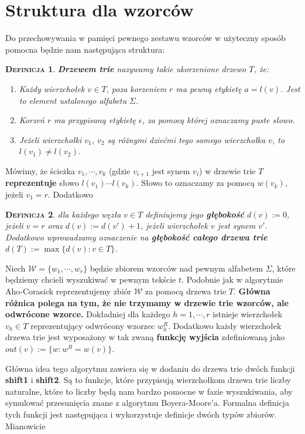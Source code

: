 \documentclass[a4paper,11pt]{article}
\newtheorem{DEF}{\textsc{Definicja}}[section]
\begin{document}
\section{Struktura dla wzorców}
Do przechowywania w pamięci pewnego zestawu wzorców w użyteczny sposób pomocna będzie nam następująca struktura:

\begin{DEF}
\textbf{Drzewem trie} nazywamy takie ukorzenione drzewo $T$, że:
\begin{enumerate}
    \item Każdy wierzchołek $v \in T$, poza korzeniem $r$ ma pewną etykietę $a = l(v)$. Jest to element ustalonego alfabetu $\Sigma$.
    \item Korzeń $r$ ma przypisaną etykietę $\epsilon$, za pomocą której oznaczamy puste słowo.
    \item Jeżeli wierzchołki $v_1$, $v_2$ są różnymi dziećmi tego samego wierzchołka $v$, to $l(v_1) \neq l(v_2)$.
\end{enumerate}
\end{DEF}

\noindent Mówimy, że ścieżka $v_1, \cdots, v_k$ (gdzie $v_{i+1}$ jest synem $v_i$) w drzewie trie $T$ \textbf{reprezentuje} słowo $l(v_1)\cdots l(v_k)$. Słowo to oznaczamy za pomocą $w(v_k)$, jeżeli $v_1 = r$. Dodatkowo 

\begin{DEF}
dla każdego węzła $v\in T$ definiujemy jego \textbf{głębokość} $d(v) := 0$, jeżeli $v=r$ oraz $d(v) := d(v') + 1$, jeżeli wierzchołek $v$ jest synem $v'$.
Dodatkowo wprowadzamy oznaczenie na \textbf{głębokość całego drzewa trie} $d(T) := \max \{ d(v) : v \in T\}$.
\end{DEF}

Niech $\mathcal{W} = \{ w_1, \cdots, w_r\}$ będzie zbiorem wzorców nad pewnym alfabetem $\Sigma$, które będziemy chcieli wyszukiwać w pewnym tekście $t$. Podobnie jak w algorytmie Aho-Corasick reprezentujemy zbiór $\mathcal{W}$ za pomocą drzewa trie $T$. \textbf{Główna różnica polega na tym, że nie trzymamy w drzewie trie wzorców, ale odwrócone wzorce.} Dokładniej dla każdego $h = 1,\cdots, r$ istnieje wierzchołek $v_h \in T$ reprezentujący odwrócony wzorzec $w_h^R$. Dodatkowo każdy wierzchołek drzewa trie jest wyposażony w tak zwaną \textbf{funkcję wyjścia} zdefiniowaną jako $out(v) := \{ w : w^R = w(v)\}$. 

Główna idea tego algorytmu zawiera się w dodaniu do drzewa trie dwóch funkcji \textbf{shift1} i \textbf{shift2}. Są to funkcje, które przypisują wierzchołkom drzewa trie liczby naturalne, które to liczby będą nam bardzo pomocne w fazie wyszukiwania, aby symulować przesunięcia znane z algorytmu Boyera-Moore'a. Formalna definicja tych funkcji jest następująca i wykorzystuje definicje dwóch typów zbiorów. Mianowicie 
\end{document}
